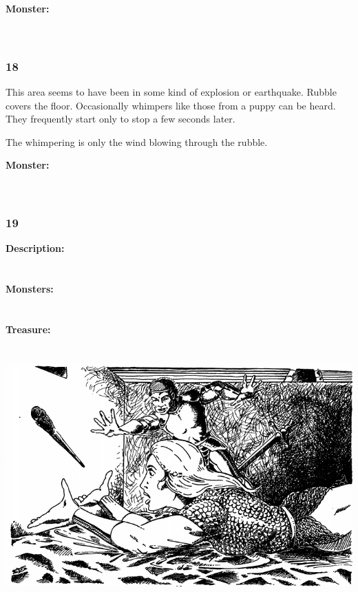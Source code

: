 \documentclass[palace_of_the_silver_princess]{subfiles}
\begin{document}
\textbf{Monster:}
\\
\\
\\

\subsubsection{18}
\begin{quotebox}
    This area seems to have been in some kind of explosion or
    earthquake. Rubble covers the floor. Occasionally whimpers like
    those from a puppy can be heard. They frequently start only to stop
    a few seconds later.
\end{quotebox}

The whimpering is only the wind blowing through the rubble.

\textbf{Monster:}
\\
\\
\\

\subsubsection{19}
\textbf{Description:}
\\
\\
\\
\textbf{Monsters:}
\\
\\
\\
\textbf{Treasure:}
\\
\\
\\

\includegraphics[width=\columnwidth]{img/wand.png}
\end{document}
